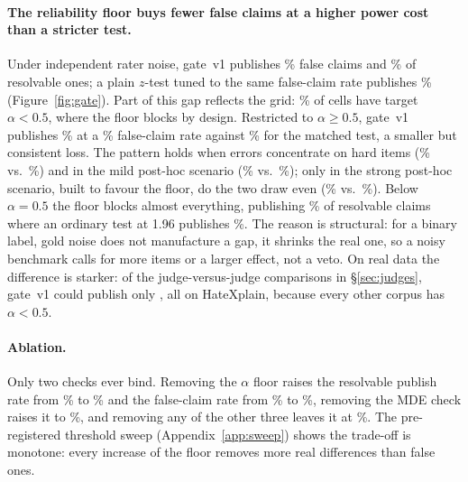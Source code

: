 \documentclass[11pt]{article}
\begin{document}
\paragraph{The reliability floor buys fewer false claims at a higher power cost than a stricter test.} Under independent rater noise, gate~v1 publishes \simFalseVoneIid\% false claims and \simResVoneIid\% of resolvable ones; a plain $z$-test tuned to the same false-claim rate publishes \simResMatchedIid\% (Figure~\ref{fig:gate}). Part of this gap reflects the grid: \simShareLowAlphaCells\% of cells have target $\alpha<0.5$, where the floor blocks by design. Restricted to $\alpha\geq0.5$, gate~v1 publishes \simResVoneIidHi\% at a \simFalseVoneIidHi\% false-claim rate against \simResMatchedIidHi\% for the matched test, a smaller but consistent loss. The pattern holds when errors concentrate on hard items (\simResVoneHet\% vs.\ \simResMatchedHet\%) and in the mild post-hoc scenario (\simResVoneHetmild\% vs.\ \simResMatchedHetmild\%); only in the strong post-hoc scenario, built to favour the floor, do the two draw even (\simResVoneHetneg\% vs.\ \simResMatchedHetneg\%). Below $\alpha=0.5$ the floor blocks almost everything, publishing \simResVoneLowAlphaIid\% of resolvable claims where an ordinary test at 1.96 publishes \simResZlowLowAlphaIid\%. The reason is structural: for a binary label, gold noise does not manufacture a gap, it shrinks the real one, so a noisy benchmark calls for more items or a larger effect, not a veto. On real data the difference is starker: of the \jPairsTotal judge-versus-judge comparisons in \S\ref{sec:judges}, gate~v1 could publish only \jPairsVonePub, all on HateXplain, because every other corpus has $\alpha<0.5$.

\paragraph{Ablation.} Only two checks ever bind. Removing the $\alpha$ floor raises the resolvable publish rate from \ablResNone\% to \ablResRel\% and the false-claim rate from \simFalseVoneIid\% to \ablFalseRel\%, removing the MDE check raises it to \ablResMde\%, and removing any of the other three leaves it at \ablResCi\%. The pre-registered threshold sweep (Appendix~\ref{app:sweep}) shows the trade-off is monotone: every increase of the floor removes more real differences than false ones.
\end{document}
